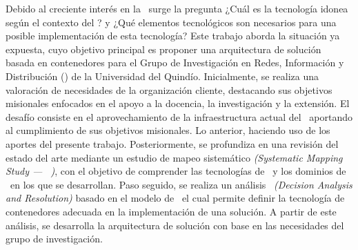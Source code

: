 Debido al creciente interés en la \VBC\ surge la pregunta ¿Cuál es la tecnología idonea según el contexto del \GRID? y ¿Qué elementos tecnológicos son necesarios para una posible implementación de esta tecnología?  Este trabajo aborda la situación ya expuesta, cuyo objetivo principal es proponer una arquitectura de solución basada en contenedores para el Grupo de Investigación en Redes, Información y Distribución (\GRID) de la Universidad del Quindío. Inicialmente, se realiza una valoración de necesidades de la organización cliente, destacando sus objetivos misionales enfocados en el apoyo a la docencia, la investigación y la extensión. El desafío consiste en el aprovechamiento de la infraestructura actual del \GRID\ aportando al cumplimiento de sus objetivos misionales. Lo anterior, haciendo uso de los aportes del presente trabajo. Posteriormente, se profundiza en una revisión del estado del arte mediante un estudio de mapeo sistemático \textit{(Systematic Mapping Study --- \SMS\ )}, con el objetivo de comprender las tecnologías de \VBC\ y los dominios de \TI\ en los que se desarrollan. Paso seguido, se realiza un análisis \DAR\ \textit{(Decision Analysis and Resolution)} basado en el modelo de \CMMI\, el cual permite definir la tecnología de contenedores adecuada
en la implementación de una solución. A partir de este análisis, se desarrolla la arquitectura de solución con base en las necesidades del grupo de investigación.